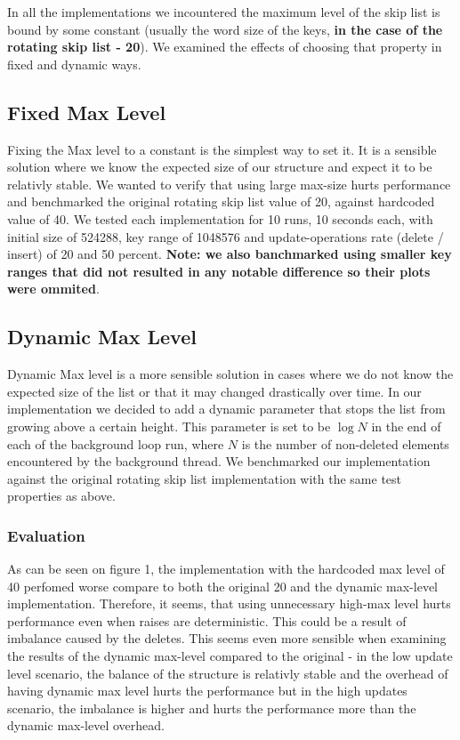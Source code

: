 \documentclass{article}
\begin{document}
In all the implementations we incountered the maximum level of the skip list is bound by some constant (usually the word size of the keys, \textbf{in the case of the rotating skip list - 20}). We examined the effects of choosing that property in fixed and dynamic ways.

\subsection{Fixed Max Level}
\label{ssec:fml}

Fixing the Max level to a constant is the simplest way to set it. It is a sensible solution where we know the expected size of our structure and expect it to be relativly stable. We wanted to verify that using large max-size hurts performance and benchmarked the original rotating skip list value of 20, against hardcoded value of 40. We tested each implementation for 10 runs, 10 seconds each, with initial size of 524288, key range of 1048576 and update-operations rate (delete / insert) of 20 and 50 percent. \textbf{Note: we also banchmarked using smaller key ranges that did not resulted in any notable difference so their plots were ommited}.

\subsection{Dynamic Max Level}
\label{ssec:dml}

Dynamic Max level is a more sensible solution in cases where we do not know the expected size of the list or that it may changed drastically over time. In our implementation we decided to add a dynamic parameter that stops the list from growing above a certain height. This parameter is set to be $\log{N}$ in the end of each of the background loop run, where $N$ is the number of non-deleted elements encountered by the background thread. We benchmarked our implementation against the original rotating skip list implementation with the same test properties as above.

\subsubsection{Evaluation}
\label{sssec:ml-evl}

As can be seen on figure 1, the implementation with the hardcoded max level of 40 perfomed worse compare to both the original 20 and the dynamic max-level implementation. Therefore, it seems, that using unnecessary high-max level hurts performance even when raises are deterministic. This could be a result of imbalance caused by the deletes. This seems even more sensible when examining the results of the dynamic max-level compared to the original - in the low update level scenario, the balance of the structure is relativly stable and the overhead of having dynamic max level hurts the performance but in the high updates scenario, the imbalance is higher and hurts the performance more than the dynamic max-level overhead.
\end{document}
